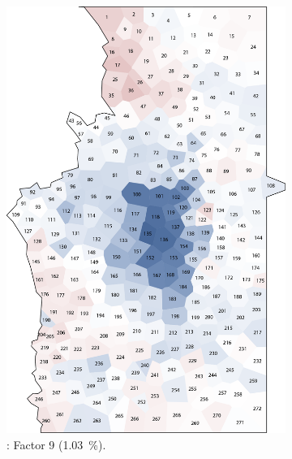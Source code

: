 \documentclass[output=paper]{LSP/langsci}
\begin{document}
\begin{figure}
\begin{subfigure}[t]{0.3\textwidth}
\includegraphics[width=\textwidth]{illustrations/pickl_fig13}
\caption{: Factor 9 (1.03~\%).}
\label{fig:13}
\end{subfigure}  
~
\begin{subfigure}[t]{0.3\textwidth}

\end{subfigure}
\end{figure}
\end{document}

